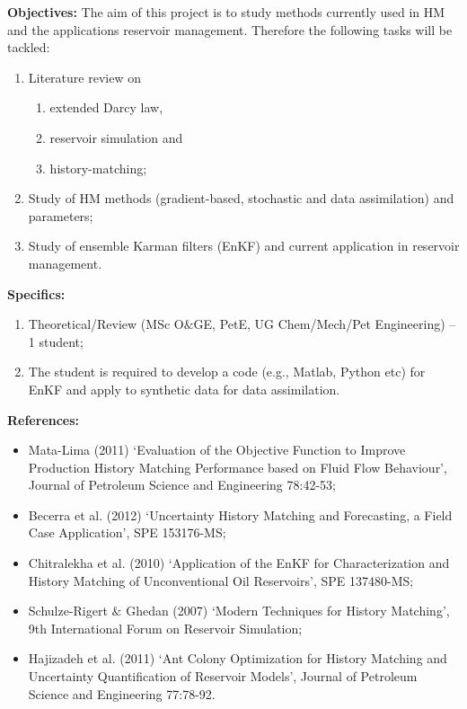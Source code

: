 \documentclass[12pts,a4paper,amsmath,amssymb,floatfix]{article}%
\newcommand{\all}{MSc O$\&$GE, PetE, UG Chem/Mech/Pet Engineering}
\begin{document}
\begin{enumerate}[label=\bfseries Project: \arabic*:]
\noindent
{\bf Objectives:} The aim of this project is to study methods currently used in HM and the applications reservoir management. Therefore the following tasks will be tackled:
\begin{enumerate}
\item Literature review on 
\begin{enumerate}
\item extended Darcy law, 
\item reservoir simulation and 
\item history-matching;
\end{enumerate}
\item Study of HM methods (gradient-based, stochastic and data assimilation) and parameters;
\item Study of ensemble Karman filters (EnKF) and current application in reservoir management. 
\end{enumerate}

\noindent
{\bf Specifics:} 
\noindent
\begin{enumerate}
\item Theoretical/Review (\all) -- 1 student;
\item The student is required to develop a code (e.g., Matlab, Python etc) for EnKF and apply to synthetic data for data assimilation.
\end{enumerate}

\noindent
{\bf References:}
\begin{itemize}
\item Mata-Lima (2011) `Evaluation of the Objective Function to Improve Production History Matching Performance based on Fluid Flow Behaviour’, Journal of Petroleum Science and Engineering 78:42-53;
\item Becerra et al. (2012) `Uncertainty History Matching and Forecasting, a Field Case Application’, SPE 153176-MS;
\item Chitralekha et al.  (2010) `Application of the EnKF for Characterization and History Matching of Unconventional Oil Reservoirs’, SPE 137480-MS;
\item Schulze-Rigert $\&$ Ghedan (2007) `Modern Techniques for History Matching’, 9th International Forum on Reservoir Simulation;
\item Hajizadeh et al. (2011) `Ant Colony Optimization for History Matching and Uncertainty Quantification of Reservoir Models’, Journal of Petroleum Science and Engineering 77:78-92. 
\end{itemize}
%
\clearpage


\end{enumerate}
\end{document}
